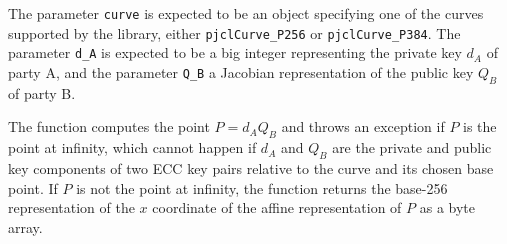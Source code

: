 \documentclass[12pt]{article}
\begin{document}
The parameter {\tt curve} is expected to be an object specifying one of the curves supported by the library,
either {\tt pjclCurve\_P256} or {\tt pjclCurve\_P384}.
The parameter {\tt d\_A} is expected to be a big integer representing the private key $d_A$ of party A, 
and the parameter {\tt Q\_B} a Jacobian representation of the public key $Q_B$ of party B.

The function computes the point $P = d_AQ_B$ and throws an exception if $P$ is the point
at infinity, which cannot happen if $d_A$ and $Q_B$ are the private and public key components
of two ECC key pairs relative to the curve and its chosen base point.
If $P$ is not the point at infinity, the function returns the base-256 representation of
the $x$ coordinate of the affine representation of $P$ as a byte array.

\clearpage


\flushleft

\end{document}

